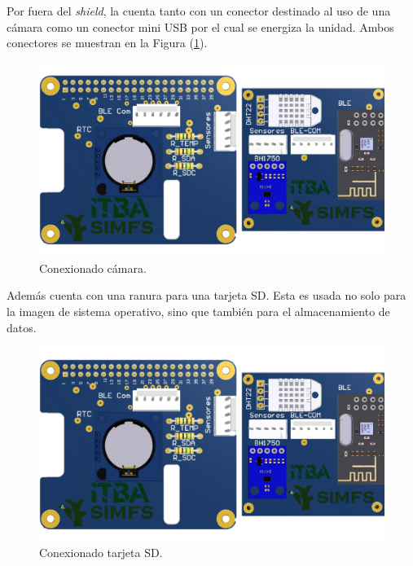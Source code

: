 Por fuera del \textit{shield}, la \rspi cuenta tanto con un conector destinado al uso de una cámara como un conector mini USB por el cual se energiza la unidad. Ambos conectores se muestran en la Figura (\ref{fig:rpiFront}).
\begin{figure}[H]
	\centering
	\includegraphics[width=\linewidth,page=3]{ImagenesIngenieria de Detalle/RPI}		
	\caption{Conexionado cámara.}
	\label{fig:rpiFront}
\end{figure}

Además cuenta con una ranura para una tarjeta SD. Esta es usada no solo para la imagen de sistema operativo, sino que también para el almacenamiento de datos.
\begin{figure}[H]
	\centering
	\includegraphics[width=0.9\linewidth,page=2]{ImagenesIngenieria de Detalle/RPI}		
	\caption{Conexionado tarjeta SD.}
	\label{fig:rpiBack}
\end{figure}
